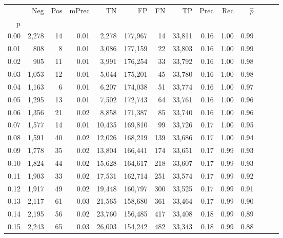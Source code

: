 \begin{tabular}{rrrrrrrrrrrrrr}
\toprule
{} &    Neg &  Pos & mPrec &       TN &       FP &      FN &      TP &  Prec &   Rec & $\hat{p}$ \\
p    &        &      &       &          &          &         &         &       &       &           \\
\midrule
0.00 &  2,278 &   14 &  0.01 &    2,278 &  177,967 &      14 &  33,811 &  0.16 &  1.00 &      0.99 \\
0.01 &    808 &    8 &  0.01 &    3,086 &  177,159 &      22 &  33,803 &  0.16 &  1.00 &      0.99 \\
0.02 &    905 &   11 &  0.01 &    3,991 &  176,254 &      33 &  33,792 &  0.16 &  1.00 &      0.98 \\
0.03 &  1,053 &   12 &  0.01 &    5,044 &  175,201 &      45 &  33,780 &  0.16 &  1.00 &      0.98 \\
0.04 &  1,163 &    6 &  0.01 &    6,207 &  174,038 &      51 &  33,774 &  0.16 &  1.00 &      0.97 \\
0.05 &  1,295 &   13 &  0.01 &    7,502 &  172,743 &      64 &  33,761 &  0.16 &  1.00 &      0.96 \\
0.06 &  1,356 &   21 &  0.02 &    8,858 &  171,387 &      85 &  33,740 &  0.16 &  1.00 &      0.96 \\
0.07 &  1,577 &   14 &  0.01 &   10,435 &  169,810 &      99 &  33,726 &  0.17 &  1.00 &      0.95 \\
0.08 &  1,591 &   40 &  0.02 &   12,026 &  168,219 &     139 &  33,686 &  0.17 &  1.00 &      0.94 \\
0.09 &  1,778 &   35 &  0.02 &   13,804 &  166,441 &     174 &  33,651 &  0.17 &  0.99 &      0.93 \\
0.10 &  1,824 &   44 &  0.02 &   15,628 &  164,617 &     218 &  33,607 &  0.17 &  0.99 &      0.93 \\
0.11 &  1,903 &   33 &  0.02 &   17,531 &  162,714 &     251 &  33,574 &  0.17 &  0.99 &      0.92 \\
0.12 &  1,917 &   49 &  0.02 &   19,448 &  160,797 &     300 &  33,525 &  0.17 &  0.99 &      0.91 \\
0.13 &  2,117 &   61 &  0.03 &   21,565 &  158,680 &     361 &  33,464 &  0.17 &  0.99 &      0.90 \\
0.14 &  2,195 &   56 &  0.02 &   23,760 &  156,485 &     417 &  33,408 &  0.18 &  0.99 &      0.89 \\
0.15 &  2,243 &   65 &  0.03 &   26,003 &  154,242 &     482 &  33,343 &  0.18 &  0.99 &      0.88 \\

\end{tabular}
